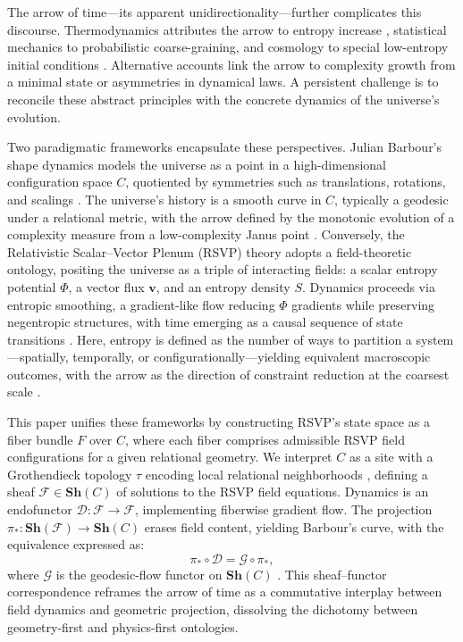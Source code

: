 \documentclass[11pt]{article}
\theoremstyle{plain}
\theoremstyle{definition}
\begin{document}
The arrow of time---its apparent unidirectionality---further complicates this discourse. Thermodynamics attributes the arrow to entropy increase \citep{Jaynes1957}, statistical mechanics to probabilistic coarse-graining, and cosmology to special low-entropy initial conditions \citep{Ellis2012}. Alternative accounts link the arrow to complexity growth from a minimal state \citep{Barbour2014} or asymmetries in dynamical laws. A persistent challenge is to reconcile these abstract principles with the concrete dynamics of the universe’s evolution.

Two paradigmatic frameworks encapsulate these perspectives. Julian Barbour’s shape dynamics models the universe as a point in a high-dimensional configuration space $C$, quotiented by symmetries such as translations, rotations, and scalings \citep{Barbour1999}. The universe’s history is a smooth curve in $C$, typically a geodesic under a relational metric, with the arrow defined by the monotonic evolution of a complexity measure from a low-complexity Janus point \citep{Barbour2014}. Conversely, the Relativistic Scalar--Vector Plenum (RSVP) theory adopts a field-theoretic ontology, positing the universe as a triple of interacting fields: a scalar entropy potential $\Phi$, a vector flux $\mathbf{v}$, and an entropy density $S$. Dynamics proceeds via entropic smoothing, a gradient-like flow reducing $\Phi$ gradients while preserving negentropic structures, with time emerging as a causal sequence of state transitions \citep{Baas2015}. Here, entropy is defined as the number of ways to partition a system---spatially, temporally, or configurationally---yielding equivalent macroscopic outcomes, with the arrow as the direction of constraint reduction at the coarsest scale \citep{Jaynes1957}.

This paper unifies these frameworks by constructing RSVP’s state space as a fiber bundle $F$ over $C$, where each fiber comprises admissible RSVP field configurations for a given relational geometry. We interpret $C$ as a site with a Grothendieck topology $\tau$ encoding local relational neighborhoods \citep{MacLane1992}, defining a sheaf $\mathscr{F} \in \mathbf{Sh}(C)$ of solutions to the RSVP field equations. Dynamics is an endofunctor $\mathcal{D}: \mathscr{F} \to \mathscr{F}$, implementing fiberwise gradient flow. The projection $\pi_*: \mathbf{Sh}(\mathscr{F}) \to \mathbf{Sh}(C)$ erases field content, yielding Barbour’s curve, with the equivalence expressed as:
\[
\pi_* \circ \mathcal{D} = \mathcal{G} \circ \pi_*,
\]
where $\mathcal{G}$ is the geodesic-flow functor on $\mathbf{Sh}(C)$ \citep{Isham2003}. This sheaf--functor correspondence reframes the arrow of time as a commutative interplay between field dynamics and geometric projection, dissolving the dichotomy between geometry-first and physics-first ontologies.
\end{document}
